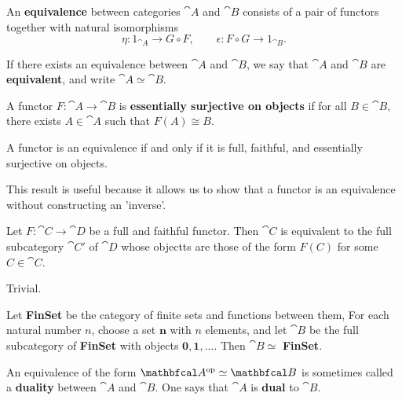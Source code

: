 \begin{definition}
    An \textbf{equivalence} between categories $\cat{A}$ and $\cat{B}$ consists of a pair of functors together with natural isomorphisms
    \begin{equation*}
        \eta: 1_{\cat{A}} \to G\circ F, \qquad \epsilon: F\circ G\to 1_{\cat{B}}.
    \end{equation*}
\end{definition}

If there exists an equivalence between $\cat{A}$ and $\cat{B}$, we say that $\cat{A}$ and $\cat{B}$ are \textbf{equivalent}, and write $\cat{A}\simeq\cat{B}$.

\begin{definition}
    A functor $F: \cat{A}\to \cat{B}$ is \textbf{essentially surjective on objects} if for all $B\in\cat{B}$, there exists $A\in\cat{A}$ such that $F(A)\cong B$.
\end{definition}

\begin{proposition}
    A functor is an equivalence if and only if it is full, faithful, and essentially surjective on objects.
\end{proposition}

This result is useful because it allows us to show that a functor is an equivalence without constructing an 'inverse'.

\begin{corollary}
    Let $F:\cat{C}\to\cat{D}$ be a full and faithful functor. Then $\cat{C}$ is equivalent to the full subcategory $\cat{C'}$ of $\cat{D}$ whose objectts are those of the form $F(C)$ for some $C\in\cat{C}$.
\end{corollary}
\proof Trivial.

\begin{example}
    Let \textbf{FinSet} be the category of finite sets and functions between them, For each natural number $n$, choose a set $\mathbf{n}$ with $n$ elements, and let $\cat{B}$ be the full subcategory of \textbf{FinSet} with objects $\mathbf{0, 1, ...}$. Then $\cat{B} \simeq$ \textbf{FinSet}.
\end{example}

\begin{example}
    An equivalence of the form $\catop{A} \simeq \cat{B}$ is sometimes called a \textbf{duality} between $\cat{A}$ and $\cat{B}$. One says that $\cat{A}$ is \textbf{dual} to $\cat{B}$.
\end{example}

